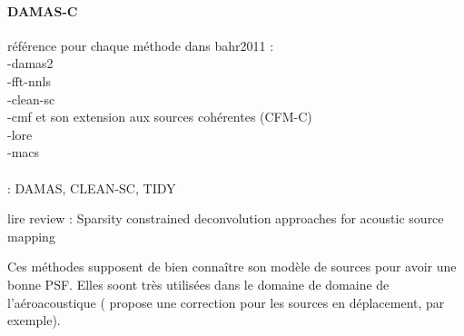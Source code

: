 \paragraph{DAMAS-C}





référence pour chaque méthode dans bahr2011 : \\
-damas2\\

-fft-nnls\\

-clean-sc\\

-cmf et son extension aux sources cohérentes (CFM-C)\\

-lore\\

-macs\\


~\\  : DAMAS, CLEAN-SC, TIDY

lire review : Sparsity constrained deconvolution approaches for acoustic
source mapping


Ces méthodes supposent de bien connaître son modèle de sources pour avoir une bonne PSF. Elles soont très utilisées dans le domaine de domaine de l'aéroacoustique (\cite{Fleury2012} propose une correction pour les sources en déplacement, par exemple).

